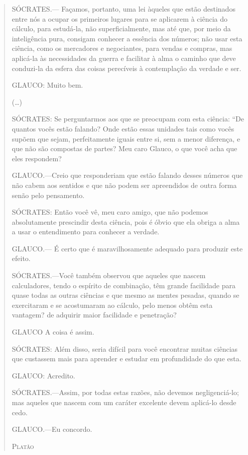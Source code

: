 \documentclass{hipatia}
\begin{document}
 


\begin{quote}
SÓCRATES.--- Façamos, portanto, uma lei àqueles que estão destinados entre nós a ocupar os primeiros lugares para se aplicarem à ciência do cálculo, para estudá-la, não superficialmente, mas até que, por meio da inteligência pura, consigam conhecer a essência dos números; não usar esta ciência, como os mercadores e negociantes, para vendas e compras, mas aplicá-la às necessidades da guerra e facilitar à alma o caminho que deve conduzi-la da esfera das coisas perecíveis à contemplação da verdade e ser.

GLAUCO: Muito bem.

(\dots)

SÓCRATES: Se perguntarmos aos que se preocupam com esta ciência: “De quantos vocês estão falando? Onde estão essas unidades tais como vocês supõem que sejam, perfeitamente iguais entre si, sem a menor diferença, e que não são compostas de partes? Meu caro Glauco, o que você acha que eles respondem?

GLAUCO.---Creio que responderiam que estão falando desses números que não cabem aos sentidos e que não podem ser apreendidos de outra forma senão pelo pensamento.

SÓCRATES: Então você vê, meu caro amigo, que não podemos absolutamente prescindir desta ciência, pois é óbvio que ela obriga a alma a usar o entendimento para conhecer a verdade.

GLAUCO.--- É certo que é maravilhosamente adequado para produzir este efeito.

SÓCRATES.---Você também observou que aqueles que nascem calculadores, tendo o espírito de combinação, têm grande facilidade para quase todas as outras ciências e que mesmo as mentes pesadas, quando se exercitaram e se acostumaram ao cálculo, pelo menos obtêm esta vantagem? de adquirir maior facilidade e penetração?

GLAUCO A coisa é assim.

SÓCRATES: Além disso, seria difícil para você encontrar muitas ciências que custassem mais para aprender e estudar em profundidade do que esta.

GLAUCO: Acredito.

SÓCRATES.---Assim, por todas estas razões, não devemos negligenciá-lo; mas aqueles que nascem com um caráter excelente devem aplicá-lo desde cedo.

GLAUCO.---Eu concordo.

\hfill \textsc{Platão}
\end{quote}
 
\end{document}
